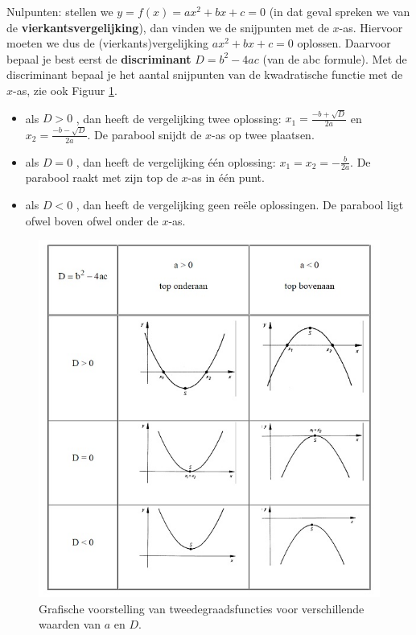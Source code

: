Nulpunten: stellen we $y=f(x)=ax^{2}+bx+c=0$
(in dat geval spreken we van de \textbf{vierkantsvergelijking}), dan
vinden we de snijpunten met de $x$-as. Hiervoor moeten we dus de
(vierkants)vergelijking $ax^{2}+bx+c=0$ oplossen. Daarvoor bepaal
je best eerst de \textbf{discriminant} $D=b^{2}-4ac$ (van de abc
formule). Met de discriminant bepaal je het aantal snijpunten van
de kwadratische functie met de $x$-as, zie ook Figuur \ref{fig:tweede:gevallen}.
\begin{itemize}
\item als $D>0$ , dan heeft de vergelijking twee oplossing: $x_{1}=\frac{-b+\sqrt{D}}{2a}$
en $x_{2}=\frac{-b-\sqrt{D}}{2a}$. De parabool snijdt de $x$-as
op twee plaatsen.
\item als $D=0$ , dan heeft de vergelijking \'e\'en oplossing: $x_{1}=x_{2}=-\frac{b}{2a}$.
De parabool raakt met zijn top de $x$-as in \'e\'en punt.
\item als $D<0$ , dan heeft de vergelijking geen re\"ele oplossingen. De
parabool ligt ofwel boven ofwel onder de $x$-as.
\end{itemize}
\begin{figure}[h]
\centering{}\includegraphics[scale=0.8]{2_elem_rekenvaardigheden_B/inputs/tweedegraadsfuncties2.jpg} 
\caption{Grafische voorstelling van tweedegraadsfuncties voor verschillende waarden van $a$ en $D$.}
\label{fig:tweede:gevallen}
\end{figure}


